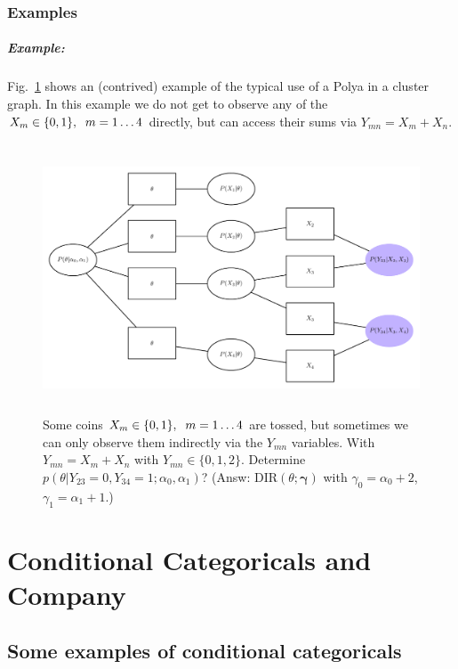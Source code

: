 \documentclass[oneside,english]{scrbook}
\begin{document}
\section{Examples}

\subsubsection{Example:}
Fig.~\ref{fig:polya_example} shows an (contrived) example of the typical
use of a Polya in a cluster graph. In this example we do not get
to observe any of the $X_m \in \{0,1\},\hspace{2mm} m = 1\ldots 4$
directly, but can access their sums via $Y_{mn} = X_m+X_n$.

\begin{figure}[htb]
\noindent \begin{centering}
\includegraphics[height=8cm]{polya_example.pdf}
\par\end{centering}
\caption{Some coins $X_m \in \{0,1\},\hspace{2mm} m = 1\ldots 4$ are
  tossed, but sometimes we can only observe them indirectly via the
  $Y_{mn}$ variables. With $Y_{mn} = X_m+X_n$ with $Y_{mn} \in \{0,1,2\}$. Determine
$p(\theta| Y_{23}=0, Y_{34}=1;\alpha_0, \alpha_1)$? (Answ:
$\mbox{DIR}(\theta;\bm{\gamma})$ with $\gamma_0 =
\alpha_0+2$, $\gamma_1=\alpha_1+1$.)}
\label{fig:polya_example}
\end{figure}

\part{Conditional Categoricals and Company}

\chapter*{Some examples of conditional categoricals}
\end{document}
